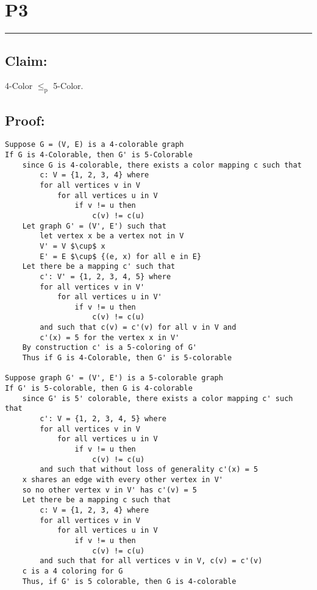\documentclass[11pt]{article}
\title{}
\author{}
\date{}
\begin{document}
\section*{P3}

\noindent\textcolor[RGB]{220,220,220}{\rule{\linewidth}{0.8pt}}

\subsection*{Claim:} 

4-Color $\leq_\text{p}$ 5-Color.

\subsection*{Proof:}

\begin{lstlisting}[basicstyle=\small, mathescape=true]
Suppose G = (V, E) is a 4-colorable graph
If G is 4-Colorable, then G' is 5-Colorable
	since G is 4-colorable, there exists a color mapping c such that
		c: V = {1, 2, 3, 4} where 
		for all vertices v in V
			for all vertices u in V
				if v != u then
					c(v) != c(u)
	Let graph G' = (V', E') such that
		let vertex x be a vertex not in V
		V' = V $\cup$ x
		E' = E $\cup$ {(e, x) for all e in E}
	Let there be a mapping c' such that
		c': V' = {1, 2, 3, 4, 5} where
		for all vertices v in V'
			for all vertices u in V'
				if v != u then
					c(v) != c(u)
		and such that c(v) = c'(v) for all v in V and
		c'(x) = 5 for the vertex x in V'
	By construction c' is a 5-coloring of G'
	Thus if G is 4-Colorable, then G' is 5-colorable

Suppose graph G' = (V', E') is a 5-colorable graph
If G' is 5-colorable, then G is 4-colorable
	since G' is 5' colorable, there exists a color mapping c' such that
		c': V = {1, 2, 3, 4, 5} where 
		for all vertices v in V
			for all vertices u in V
				if v != u then
					c(v) != c(u)
		and such that without loss of generality c'(x) = 5
	x shares an edge with every other vertex in V'
	so no other vertex v in V' has c'(v) = 5
	Let there be a mapping c such that
		c: V = {1, 2, 3, 4} where 
		for all vertices v in V
			for all vertices u in V
				if v != u then
					c(v) != c(u)
		and such that for all vertices v in V, c(v) = c'(v)
	c is a 4 coloring for G
	Thus, if G' is 5 colorable, then G is 4-colorable
\end{lstlisting}
\end{document}
